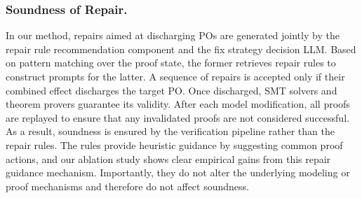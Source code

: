\subsubsection{Soundness of Repair.}
In our method, repairs aimed at discharging POs are generated jointly by the repair rule recommendation component and the fix strategy decision LLM.
Based on pattern matching over the proof state, the former retrieves repair rules to construct prompts for the latter.
A sequence of repairs is accepted only if their combined effect discharges the target PO.
Once discharged, SMT solvers and theorem provers guarantee its validity.
After each model modification, all proofs are replayed to ensure that any invalidated proofs are not considered successful.
As a result, soundness is ensured by the verification pipeline rather than the repair rules.
The rules provide heuristic guidance by suggesting common proof actions, and our ablation study shows clear empirical gains from this repair guidance mechanism.
Importantly, they do not alter the underlying modeling or proof mechanisms and therefore do not affect soundness.
